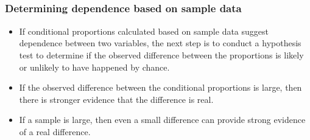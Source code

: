 \documentclass[11pt,containsverbatim,handout]{beamer}
\newcommand{\soln}[1]{ }
\begin{document}


\begin{frame}
\frametitle{}


$\:$ \\
\small{
\soln{\pause{
Proportion(prefers in-person work) = 0.58 \\
\pause
$\:$ \\
P(randomly selected employee prefers in-person work, given that the employee is in the IT department) = ? \\ 
Proportion(prefers in-person $|$ IT) = 0.67 \\
$\:$ \\
Proportion(prefers in-person $|$ HR) = 0.28 \\
$\:$ \\
Proportion(prefers in-person $|$ Sales) = 0.64 \\
$\:$ \\
\pause
P(prefers in-person work) seems to vary by department, therefore preference for in-person vs remote work and department are most likely dependent.
}}
}
\end{frame}


\begin{frame}
\frametitle{Determining dependence based on sample data}

\begin{itemize}

\item If conditional proportions calculated based on sample data suggest dependence between two variables, the next step is to conduct a hypothesis test to determine if the observed difference between the proportions is likely or unlikely to have happened by chance.

\item If the observed difference between the conditional proportions is large, then there is stronger evidence that the difference is real.

\item If a sample is large, then even a small difference can provide strong evidence of a real difference.

\end{itemize}

\pause

 \pause \soln{$n = 50,000$}

\end{frame}
\end{document}
